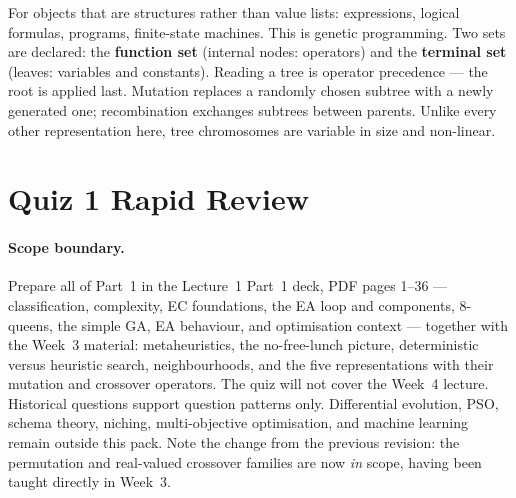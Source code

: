 \documentclass[11pt,a4paper]{article}
\begin{document}
For objects that are structures rather than value lists: expressions, logical
formulas, programs, finite-state machines. This is genetic programming. Two
sets are declared: the \textbf{function set} (internal nodes: operators) and
the \textbf{terminal set} (leaves: variables and constants). Reading a tree is
operator precedence --- the root is applied last. Mutation replaces a randomly
chosen subtree with a newly generated one; recombination exchanges subtrees
between parents. Unlike every other representation here, tree chromosomes are
variable in size and non-linear.

\section{Quiz 1 Rapid Review}

\paragraph{Scope boundary.}
Prepare all of Part~1 in the Lecture~1 Part~1 deck, PDF pages 1--36 ---
classification, complexity, EC foundations, the EA loop and components,
8-queens, the simple GA, EA behaviour, and optimisation context --- together
with the Week~3 material: metaheuristics, the no-free-lunch picture,
deterministic versus heuristic search, neighbourhoods, and the five
representations with their mutation and crossover operators. The quiz will not
cover the Week~4 lecture. Historical questions support question patterns only.
Differential evolution, PSO, schema theory, niching, multi-objective
optimisation, and machine learning remain outside this pack. Note the change
from the previous revision: the permutation and real-valued crossover families
are now \emph{in} scope, having been taught directly in Week~3.
\end{document}
